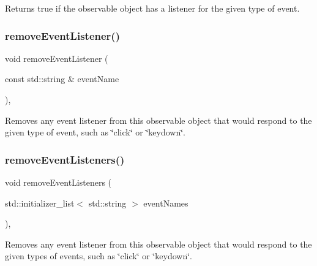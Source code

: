 Returns true if the observable object has a listener for the given type of event. 

\mbox{\label{classGObservable_acbcf1ed3a851ad8a3c17ef38d86b481d}} 
\subsubsection{\texorpdfstring{remove\+Event\+Listener()}{removeEventListener()}}
{\footnotesize\ttfamily void remove\+Event\+Listener (\begin{DoxyParamCaption}\item[{const std\+::string \&}]{event\+Name }\end{DoxyParamCaption})\hspace{0.3cm}{\ttfamily [protected]}, {\ttfamily [virtual]}}



Removes any event listener from this observable object that would respond to the given type of event, such as \char`\"{}click\char`\"{} or \char`\"{}keydown\char`\"{}. 

\mbox{\label{classGObservable_af51cc35c29a1bd1908609d432decdbb6}} 
\subsubsection{\texorpdfstring{remove\+Event\+Listeners()}{removeEventListeners()}}
{\footnotesize\ttfamily void remove\+Event\+Listeners (\begin{DoxyParamCaption}\item[{std\+::initializer\+\_\+list$<$ std\+::string $>$}]{event\+Names }\end{DoxyParamCaption})\hspace{0.3cm}{\ttfamily [protected]}, {\ttfamily [virtual]}}



Removes any event listener from this observable object that would respond to the given types of events, such as \char`\"{}click\char`\"{} or \char`\"{}keydown\char`\"{}. 

\mbox{\label{classGObservable_ad2f6d34961c50f6c1e0659990b79f741}} 
